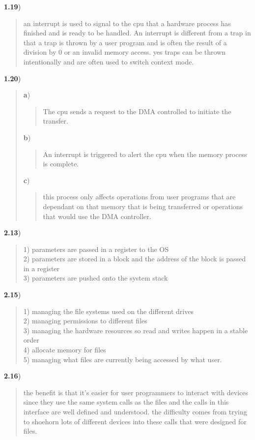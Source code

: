 \documentclass[11pt]{article}
\newenvironment{subquestion}[1]{\textbf{#1}) \begin{quote}}{\end{quote}}
\begin{document}
  \begin{subquestion}{1.19}
    an interrupt is used to signal to the cpu that a hardware process has finished and is ready to be handled. An interrupt is different from a trap in that a trap is thrown by a user
    program and is often the result of a division by 0 or an invalid memory access. yes traps can be thrown intentionally and are often used to switch context mode.
  \end{subquestion}

  \begin{subquestion}{1.20}
    \begin{subquestion}{a}
      The cpu sends a request to the DMA controlled to initiate the transfer.
    \end{subquestion}

    \begin{subquestion}{b}
      An interrupt is triggered to alert the cpu when the memory process is complete.
    \end{subquestion}

    \begin{subquestion}{c}
      this process only affects operations from user programs that are dependant on that memory that
      is being transferred or operations that would use the DMA controller.
    \end{subquestion}
  \end{subquestion}

  \begin{subquestion}{2.13}
    1) parameters are passed in a register to the OS\\
    2) parameters are stored in a block and the address of the block is passed in a register\\
    3) parameters are pushed onto the system stack
  \end{subquestion}

  \begin{subquestion}{2.15}
    1) managing the file systems used on the different drives\\
    2) managing permissions to different files\\
    3) managing the hardware resources so read and writes happen in a stable order\\
    4) allocate memory for files\\
    5) managing what files are currently being accessed by what user.
  \end{subquestion}

  \begin{subquestion}{2.16}
    the benefit is that it's easier for user programmers to interact with devices since they use the
    same system calls as the files and the calls in this interface are well defined and understood.
    the difficulty comes from trying to shoehorn lots of different devices into these calls
    that were designed for files.
  \end{subquestion}
\end{document}

